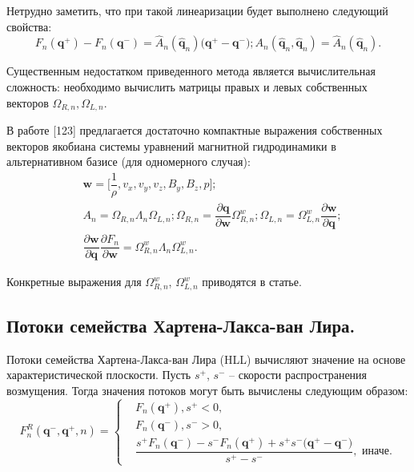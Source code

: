 \documentclass[14pt, a4paper, fleqn]{extreport}
\begin{document}
	Нетрудно заметить, что при такой линеаризации будет выполнено следующий свойства:
	\begin{equation*}
		F_n(\textbf{q}^{+}) - F_n(\textbf{q}^{-}) 
			= \hat{A}_n(\hat{\textbf{q}}_n)\Big( \textbf{q}^{+}-\textbf{q}^{-} \Big);
		A_n(\hat{\textbf{q}}_n,\hat{\textbf{q}}_n) = \hat{A}_n(\hat{\textbf{q}}_n).
	\end{equation*}

	Существенным недостатком приведенного метода является вычислительная сложность:
	необходимо вычислить матрицы правых и левых собственных векторов $\Omega_{R,n}, \Omega_{L,n}$.
	
	В работе [123] предлагается достаточно компактные выражения собственных векторов
	якобиана системы уравнений магнитной гидродинамики
	в альтернативном базисе (для одномерного случая):
	\begin{equation*}
	\begin{split}
		&\textbf{w} = \Big[ \dfrac{1}{\rho}, v_x, v_y, v_z, B_y, B_z, p \Big]; \\
		&A_n 
			= \Omega_{R,n}\Lambda_{n}\Omega_{L,n}; 
			  \Omega_{R,n} = \dfrac{\partial\textbf{q}}{\partial\textbf{w}} \Omega_{R,n}^w;
			  \Omega_{L,n} = \Omega_{L,n}^w \dfrac{\partial\textbf{w}}{\partial\textbf{q}}; \\
		&\dfrac{\partial\textbf{w}}{\partial\textbf{q}} \dfrac{\partial F_n}{\partial \textbf{w}}
			= \Omega_{R,n}^w\Lambda_{n}\Omega_{L,n}^w.
	\end{split}
	\end{equation*}
	
	Конкретные выражения для $\Omega_{R,n}^w$, $\Omega_{L,n}^w$ приводятся в статье.
	
	\subsection{Потоки семейства Хартена-Лакса-ван Лира.}
	
	Потоки семейства Хартена-Лакса-ван Лира (HLL)
	вычисляют значение на основе характеристической плоскости.
	Пусть $s^{+}$, $s^{-}$ -- скорости распространения возмущения.
	Тогда значения потоков могут быть вычислены следующим образом:
	\begin{equation*}
		F_{n}^R(\textbf{q}^{-},\textbf{q}^{+},n) = 
		\begin{cases}
			&F_n(\textbf{q}^{+}), s^{+} < 0, \\
			&F_n(\textbf{q}^{-}), s^{-} > 0, \\
			&\dfrac{ s^{+}F_n(\textbf{q}^{-}) -
				     s^{-}F_n(\textbf{q}^{+}) + 
			         s^{+}s^{-}\big( \textbf{q}^{+} - \textbf{q}^{-} \big)}{ s^{+}-s^{-} }, \text{ иначе}.
		\end{cases}
	\end{equation*}
	
\end{document}
